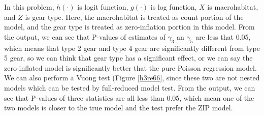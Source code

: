 \documentclass[letterpaper, 12pt]{article}
\begin{document}
In this problem, $h(\cdot)$ is logit function, $g(\cdot)$ is log function, $X$ is macrohabitat, and $Z$ is gear type. Here, the macrohabitat is treated as count portion of the model, and the gear type is treated as zero-inflation portion in this model. From the output, we can see that P-values of estimates of $\gamma_3$ an $\gamma_5$ are less that 0.05, which means that type 2 gear and type 4 gear are significantly different from type 5 gear, so we can think that gear type has a significant effect, or we can say the zero-inflated model is significantly better that the pure Poisson regression model. We can also perform a Vuong test (Figure \ref{h3re66}, since these two are not nested models which can be tested by full-reduced model test. From the output, we can see that P-values of three statistics are all less than 0.05, which mean one of the two models is closer to the true model and the test prefer the ZIP model.












\end{document}
